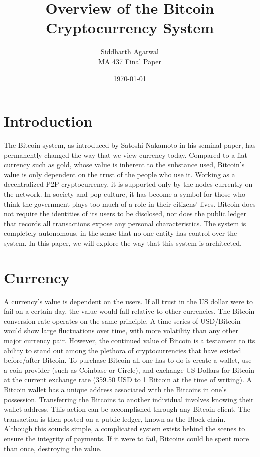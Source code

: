 \documentclass[12pt]{article}
\title{\textbf{Overview of the Bitcoin Cryptocurrency System}}
\author{Siddharth Agarwal\\
	MA 437 Final Paper}
\date{\today}
\begin{document}
\maketitle

\section{Introduction}

The Bitcoin system, as introduced by Satoshi Nakamoto in his seminal paper, has permanently changed the way that we view currency today. Compared to a fiat currency such as gold, whose value is inherent to the substance used, Bitcoin's value is only dependent on the trust of the people who use it. Working as a decentralized P2P cryptocurrency, it is supported only by the nodes currently on the network. In society and pop culture, it has become a symbol for those who think the government plays too much of a role in their citizens' lives. Bitcoin does not require the identities of its users to be disclosed, nor does the public ledger that records all transactions expose any personal characteristics. The system is completely autonomous, in the sense that no one entity has control over the system. In this paper, we will explore the way that this system is architected.

\section{Currency}
A currency's value is dependent on the users. If all trust in the US dollar were to fail on a certain day, the value would fall relative to other currencies. The Bitcoin conversion rate operates on the same principle. A time series of USD/Bitcoin would show large fluctuations over time, with more volatility than any other major currency pair. However, the continued value of Bitcoin is a testament to its ability to stand out among the plethora of cryptocurrencies that have existed before/after Bitcoin. To purchase Bitcoin all one has to do is create a wallet, use a coin provider (such as Coinbase or Circle), and exchange US Dollars for Bitcoin at the current exchange rate (359.50 USD to 1 Bitcoin at the time of writing). A Bitcoin wallet has a unique address associated with the Bitcoins in one's possession. Transferring the Bitcoins to another individual involves knowing their wallet address. This action can be accomplished through any Bitcoin client. The transaction is then posted on a public ledger, known as the Block chain. Although this sounds simple, a complicated system exists behind the scenes to ensure the integrity of payments. If it were to fail, Bitcoins could be spent more than once, destroying the value.
\end{document}
